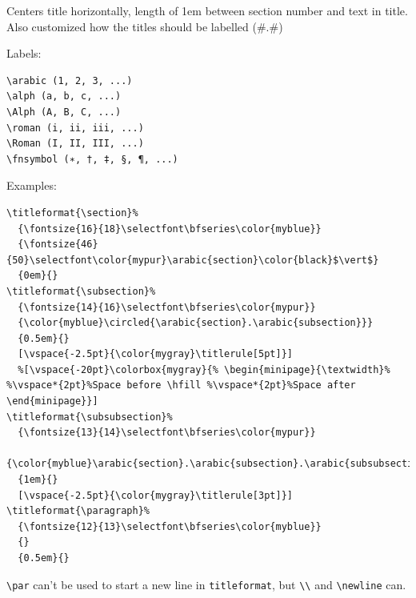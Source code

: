\documentclass{article}
\begin{document}
Centers title horizontally, length of 1em between section number
and text in title. Also customized how the titles should be labelled
(\#.\#)

Labels:
\begin{lstlisting}
\arabic (1, 2, 3, ...)
\alph (a, b, c, ...)
\Alph (A, B, C, ...)
\roman (i, ii, iii, ...)
\Roman (I, II, III, ...)
\fnsymbol (∗, †, ‡, §, ¶, ...)
\end{lstlisting}
Examples:
\begin{lstlisting}
\titleformat{\section}%
  {\fontsize{16}{18}\selectfont\bfseries\color{myblue}}
  {\fontsize{46}{50}\selectfont\color{mypur}\arabic{section}\color{black}$\vert$}
  {0em}{}
\titleformat{\subsection}%
  {\fontsize{14}{16}\selectfont\bfseries\color{mypur}}
  {\color{myblue}\circled{\arabic{section}.\arabic{subsection}}}
  {0.5em}{}
  [\vspace{-2.5pt}{\color{mygray}\titlerule[5pt]}]
  %[\vspace{-20pt}\colorbox{mygray}{% \begin{minipage}{\textwidth}% %\vspace*{2pt}%Space before \hfill %\vspace*{2pt}%Space after \end{minipage}}]
\titleformat{\subsubsection}%
  {\fontsize{13}{14}\selectfont\bfseries\color{mypur}}
  {\color{myblue}\arabic{section}.\arabic{subsection}.\arabic{subsubsection}}
  {1em}{}
  [\vspace{-2.5pt}{\color{mygray}\titlerule[3pt]}]
\titleformat{\paragraph}%
  {\fontsize{12}{13}\selectfont\bfseries\color{myblue}}
  {}
  {0.5em}{}
\end{lstlisting}
\verb|\par| can't be used to start a new line in \verb|titleformat|, but
\verb|\\| and
\verb|\newline| can.
\end{document}
